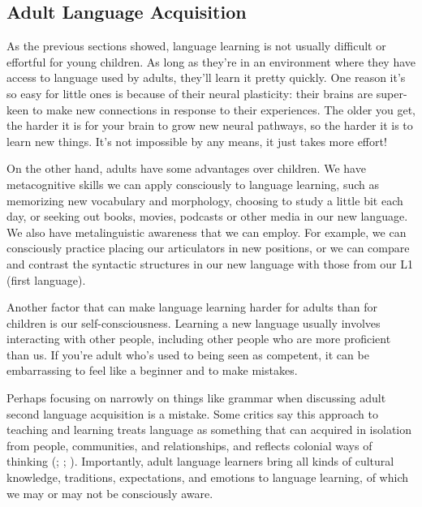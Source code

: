 \documentclass[
]{krantz}
\begin{document}
\subsection*{Adult Language Acquisition}\label{adult-language-acquisition}


As the previous sections showed, language learning is not usually difficult or effortful for young children. As long as they're in an environment where they have access to language used by adults, they'll learn it pretty quickly. One reason it's so easy for little ones is because of their neural plasticity: their brains are super-keen to make new connections in response to their experiences. The older you get, the harder it is for your brain to grow new neural pathways, so the harder it is to learn new things. It's not impossible by any means, it just takes more effort!

On the other hand, adults have some advantages over children. We have metacognitive skills we can apply consciously to language learning, such as memorizing new vocabulary and morphology, choosing to study a little bit each day, or seeking out books, movies, podcasts or other media in our new language. We also have metalinguistic awareness that we can employ. For example, we can consciously practice placing our articulators in new positions, or we can compare and contrast the syntactic structures in our new language with those from our L1 (first language).

Another factor that can make language learning harder for adults than for children is our self-consciousness. Learning a new language usually involves interacting with other people, including other people who are more proficient than us. If you're adult who's used to being seen as competent, it can be embarrassing to feel like a beginner and to make mistakes.

Perhaps focusing on narrowly on things like grammar when discussing adult second language acquisition is a mistake. Some critics say this approach to teaching and learning treats language as something that can acquired in isolation from people, communities, and relationships, and reflects colonial ways of thinking (; ; ). Importantly, adult language learners bring all kinds of cultural knowledge, traditions, expectations, and emotions to language learning, of which we may or may not be consciously aware.
\end{document}
